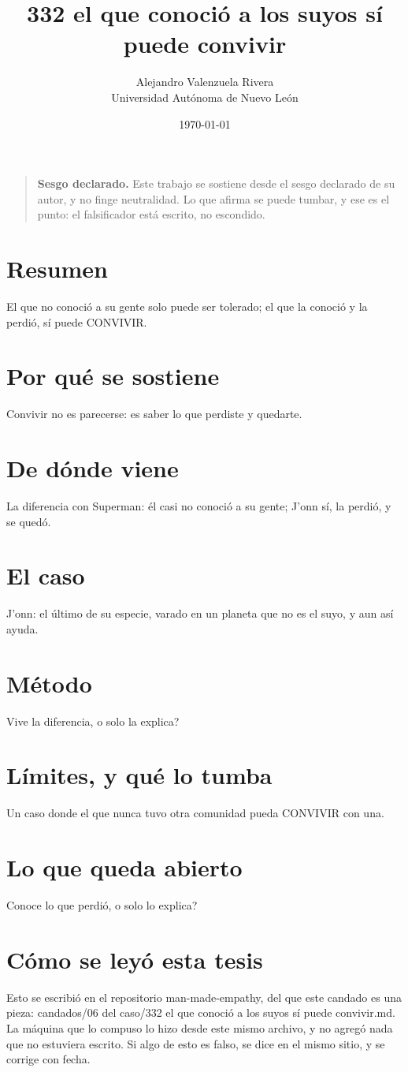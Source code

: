 \documentclass[11pt,a4paper]{article}
\title{332 el que conoció a los suyos sí puede convivir}
\author{Alejandro Valenzuela Rivera\\\small Universidad Autónoma de Nuevo León}
\date{\today}
\begin{document}
\maketitle

\begin{quote}
\textbf{Sesgo declarado.} Este trabajo se sostiene desde el sesgo declarado de su autor, y no finge neutralidad. Lo que afirma se puede tumbar, y ese es el punto: el falsificador está escrito, no escondido.
\end{quote}

\section*{Resumen}
El que no conoció a su gente solo puede ser tolerado; el que la conoció y la perdió, sí puede CONVIVIR.

\section{Por qué se sostiene}
Convivir no es parecerse: es saber lo que perdiste y quedarte.

\section{De dónde viene}
La diferencia con Superman: él casi no conoció a su gente; J'onn sí, la perdió, y se quedó.

\section{El caso}
J'onn: el último de su especie, varado en un planeta que no es el suyo, y aun así ayuda.

\section{Método}
\textquestiondown{}Vive la diferencia, o solo la explica?

\section{Límites, y qué lo tumba}
Un caso donde el que nunca tuvo otra comunidad pueda CONVIVIR con una.

\section{Lo que queda abierto}
\textquestiondown{}Conoce lo que perdió, o solo lo explica?

\section*{Cómo se leyó esta tesis}
Esto se escribió en el repositorio man-made-empathy, del que este candado es una pieza: candados/06 del caso/332 el que conoció a los suyos sí puede convivir.md. La máquina que lo compuso lo hizo desde este mismo archivo, y no agregó nada que no estuviera escrito. Si algo de esto es falso, se dice en el mismo sitio, y se corrige con fecha.
\end{document}
